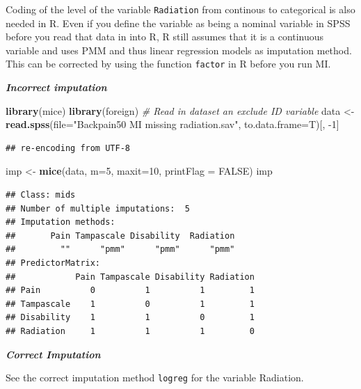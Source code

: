 \documentclass[
]{book}
\newenvironment{Shaded}{\begin{snugshade}}{\end{snugshade}}
\newcommand{\CommentTok}[1]{\textcolor[rgb]{0.56,0.35,0.01}{\textit{#1}}}
\newcommand{\DataTypeTok}[1]{\textcolor[rgb]{0.13,0.29,0.53}{#1}}
\newcommand{\DecValTok}[1]{\textcolor[rgb]{0.00,0.00,0.81}{#1}}
\newcommand{\KeywordTok}[1]{\textcolor[rgb]{0.13,0.29,0.53}{\textbf{#1}}}
\newcommand{\NormalTok}[1]{#1}
\newcommand{\OtherTok}[1]{\textcolor[rgb]{0.56,0.35,0.01}{#1}}
\newcommand{\StringTok}[1]{\textcolor[rgb]{0.31,0.60,0.02}{#1}}
\begin{document}
Coding of the level of the variable \texttt{Radiation} from continous to categorical is also needed in R. Even if you define the variable as being a nominal variable in SPSS before you read that data in into R, R still assumes that it is a continuous variable and uses PMM and thus linear regression models as imputation method. This can be corrected by using the function
\texttt{factor} in R before you run MI.

\textbf{\emph{Incorrect imputation}}

\begin{Shaded}
\begin{Highlighting}[]
\KeywordTok{library}\NormalTok{(mice)}
\KeywordTok{library}\NormalTok{(foreign)}
\CommentTok{# Read in dataset an exclude ID variable}
\NormalTok{data <-}\StringTok{ }\KeywordTok{read.spss}\NormalTok{(}\DataTypeTok{file=}\StringTok{"Backpain50 MI missing radiation.sav"}\NormalTok{, }\DataTypeTok{to.data.frame=}\NormalTok{T)[, }\DecValTok{-1}\NormalTok{] }
\end{Highlighting}
\end{Shaded}

\begin{verbatim}
## re-encoding from UTF-8
\end{verbatim}

\begin{Shaded}
\begin{Highlighting}[]
\NormalTok{imp <-}\StringTok{ }\KeywordTok{mice}\NormalTok{(data, }\DataTypeTok{m=}\DecValTok{5}\NormalTok{, }\DataTypeTok{maxit=}\DecValTok{10}\NormalTok{, }\DataTypeTok{printFlag =} \OtherTok{FALSE}\NormalTok{)}
\NormalTok{imp}
\end{Highlighting}
\end{Shaded}

\begin{verbatim}
## Class: mids
## Number of multiple imputations:  5 
## Imputation methods:
##       Pain Tampascale Disability  Radiation 
##         ""      "pmm"      "pmm"      "pmm" 
## PredictorMatrix:
##            Pain Tampascale Disability Radiation
## Pain          0          1          1         1
## Tampascale    1          0          1         1
## Disability    1          1          0         1
## Radiation     1          1          1         0
\end{verbatim}

\textbf{\emph{Correct Imputation}}

See the correct imputation method \texttt{logreg} for the variable Radiation.
\end{document}

